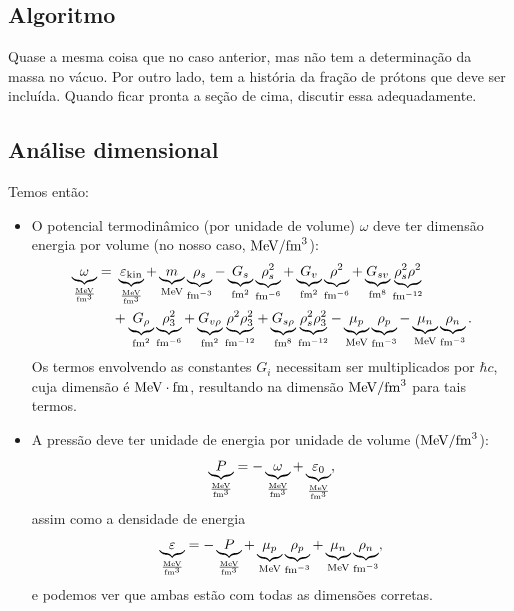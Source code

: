 \subsection{Algoritmo}

Quase a mesma coisa que no caso anterior, mas não tem a determinação da massa no vácuo. Por outro lado, tem a história da fração de prótons que deve ser incluída. Quando ficar pronta a seção de cima, discutir essa adequadamente.

\subsection{Análise dimensional}

Temos então:
\begin{fullwidth}
\begin{itemize}

\item O potencial termodinâmico (por unidade de volume) $\omega$ deve ter dimensão energia por volume (no nosso caso, $\rm{MeV}/\rm{fm}^3$):
\begin{equation}
\begin{split}
	\underbrace{\omega}_{\frac{\rm{MeV}}{\rm{fm}^3}} =&~ \underbrace{\varepsilon_{\rm{kin}}}_{\frac{\rm{MeV}}{\rm{fm}^3}} +\underbrace{m}_{\rm{MeV}}\underbrace{\rho_s}_{\rm{fm}^{-3}} - \underbrace{G_s}_{\rm{fm}^2}\underbrace{\rho_s^2}_{\rm{fm}^{-6}} + \underbrace{G_v}_{\rm{fm}^2}\underbrace{\rho^2}_{\rm{fm}^{-6}} + \underbrace{G_{sv}}_{\rm{fm}^8}\underbrace{\rho_s^2\rho^2}_{\rm{fm}^{-12}} \\
&+ \underbrace{G_\rho}_{\rm{fm}^2}\underbrace{\rho_3^2}_{\rm{fm}^{-6}} + \underbrace{G_{v\rho}}_{\rm{fm}^2}\underbrace{\rho^2\rho_3^2}_{\rm{fm}^{-12}} + \underbrace{G_{s\rho}}_{\rm{fm}^8}\underbrace{\rho_s^2\rho_3^2}_{\rm{fm}^{-12}} - \underbrace{\mu_p}_{\rm{MeV}}\underbrace{\rho_p}_{\rm{fm}^{-3}} - \underbrace{\mu_n}_{\rm{MeV}}\underbrace{\rho_n}_{\rm{fm}^{-3}}.
\end{split}
\end{equation}
%
Os termos envolvendo as constantes $G_i$ necessitam ser multiplicados por $\hbar c$, cuja dimensão é $\rm{MeV}\cdot\rm{fm}$, resultando na dimensão $\rm{MeV}/\rm{fm}^3$ para tais termos.

\item A pressão deve ter unidade de energia por unidade de volume ($\rm{MeV}/\rm{fm}^3$):
\begin{equation}
	\underbrace{P}_{\frac{\rm{MeV}}{\rm{fm}^3}} = - \underbrace{\omega}_{\frac{\rm{MeV}}{\rm{fm}^3}} + \underbrace{\varepsilon_0}_{\frac{\rm{MeV}}{\rm{fm}^3}},
\end{equation}
%
assim como a densidade de energia
\begin{equation}
	\underbrace{\varepsilon}_{\frac{\rm{MeV}}{\rm{fm}^3}} = - \underbrace{P}_{\frac{\rm{MeV}}{\rm{fm}^3}} + \underbrace{\mu_p}_{\rm{MeV}}\underbrace{\rho_p}_{\rm{fm}^{-3}} + \underbrace{\mu_n}_{\rm{MeV}}\underbrace{\rho_n}_{\rm{fm}^{-3}},
\end{equation}
%
e podemos ver que ambas estão com todas as dimensões corretas.


\end{itemize}
\end{fullwidth}

